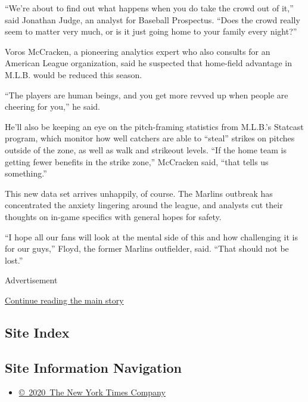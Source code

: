 ``We're about to find out what happens when you do take the crowd out of
it,'' said Jonathan Judge, an analyst for Baseball Prospectus. ``Does
the crowd really seem to matter very much, or is it just going home to
your family every night?''

Voros McCracken, a pioneering analytics expert who also consults for an
American League organization, said he suspected that home-field
advantage in M.L.B. would be reduced this season.

``The players are human beings, and you get more revved up when people
are cheering for you,'' he said.

He'll also be keeping an eye on the pitch-framing statistics from
M.L.B.'s Statcast program, which monitor how well catchers are able to
``steal'' strikes on pitches outside of the zone, as well as walk and
strikeout levels. ``If the home team is getting fewer benefits in the
strike zone,'' McCracken said, ``that tells us something.''

This new data set arrives unhappily, of course. The Marlins outbreak has
concentrated the anxiety lingering around the league, and analysts cut
their thoughts on in-game specifics with general hopes for safety.

``I hope all our fans will look at the mental side of this and how
challenging it is for our guys,'' Floyd, the former Marlins outfielder,
said. ``That should not be lost.''

Advertisement

\protect\hyperlink{after-bottom}{Continue reading the main story}

\hypertarget{site-index}{%
\subsection{Site Index}\label{site-index}}

\hypertarget{site-information-navigation}{%
\subsection{Site Information
Navigation}\label{site-information-navigation}}

\begin{itemize}
\tightlist
\item
  \href{https://help.nytimes.com/hc/en-us/articles/115014792127-Copyright-notice}{©~2020~The
  New York Times Company}
\end{itemize}

